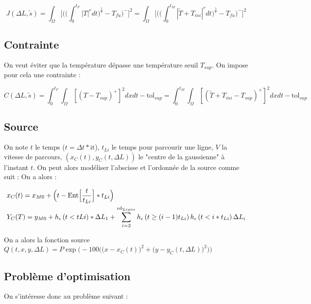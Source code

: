 \documentclass[11pt,a4paper]{article}
\begin{document}
\begin{equation}
J(\Delta L,\tilde{s})=\int_{\Omega}\Bigg[\Bigg(\Big(\int_{0}^{t_F}|T|^rdt\Big)^{\frac{1}{r}}-T_{fu}\Bigg)^-\Bigg]^2=\int_{\Omega}\Bigg[\Bigg(\Big(\int_{0}^{t_M}|\tilde{T}+T_{ini}|^rdt\Big)^{\frac{1}{r}}-T_{fu}\Bigg)^-\Bigg]^2
\end{equation}

\subsection*{Contrainte}
On veut éviter que la température dépasse une température seuil $T_{sup}$. On impose pour cela une contrainte :

\begin{equation}
\label{eq:contrainte}
C(\Delta L,\tilde{s})=\int_{0}^{t_F}\int_{\Omega}[(T-T_{sup})^+]^2dxdt-\textrm{tol}_{sup}=\int_{0}^{t_M}\int_{\Omega}[(\tilde{T}+T_{ini}-T_{sup})^+]^2dxdt-\textrm{tol}_{sup}
\end{equation} 


\subsection*{Source}
On note $t$ le temps ($t=\Delta t*\textrm{it}$), $t_{Li}$ le temps pour parcourir une ligne, $V$ la vitesse de parcours, $(x_C(t),y_C(t,\Delta L))$ le "centre de la gaussienne" à l'instant $t$. On peut alors modéliser l'abscisse et l'ordonnée de la source comme suit :
 On a alors :

\begin{equation}
\begin{aligned}
&x_C(t)=x_{M0}+\Big(t-\textrm{Ent}\Big[\frac{t}{t_{Li}}\Big]*t_{Li}\Big) \\
&Y_C(T)=y_{M0}+h_{\epsilon}\left(t<t{Li}\right)*\Delta L_{1}+\sum_{i=2}^{nb_{Ligne}}h_{\epsilon}\left(t\geq(i-1)t_{Li}\right)h_{\epsilon}\left(t<i*t_{Li}\right)\Delta L_{i}
\end{aligned}
\end{equation}

On a alors la fonction source $Q(t,x,y,\Delta L)=P\exp\bigg(-100\Big(\big(x-x_C(t)\big)^2+\big(y-y_C(t,\Delta L)\big)^2\Big)\bigg)$


\subsection*{Problème d'optimisation}

On s'intéresse donc au problème suivant :
\end{document}
